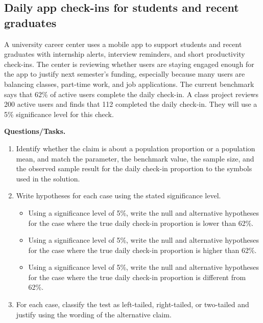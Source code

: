 	
	\begin{ExamProblems}
		
		\item
		\section{Daily app check-ins for students and recent graduates}
		A university career center uses a mobile app to support students and recent graduates with internship alerts, interview reminders, and short productivity check-ins. The center is reviewing whether users are staying engaged enough for the app to justify next semester's funding, especially because many users are balancing classes, part-time work, and job applications. The current benchmark says that 62\% of active users complete the daily check-in. A class project reviews 200 active users and finds that 112 completed the daily check-in. They will use a 5\% significance level for this check.
		
		\textbf{Questions/Tasks.}
		\begin{enumerate}
			\item[(C1)] Identify whether the claim is about a population proportion or a population mean, and match the parameter, the benchmark value, the sample size, and the observed sample result for the daily check-in proportion to the symbols used in the solution.
			\item[(C2)] Write hypotheses for each case using the stated significance level.
			\begin{itemize}
				\item[(a)] Using a significance level of 5\%, write the null and alternative hypotheses for the case where the true daily check-in proportion is lower than 62\%.
				\item[(b)] Using a significance level of 5\%, write the null and alternative hypotheses for the case where the true daily check-in proportion is higher than 62\%.
				\item[(c)] Using a significance level of 5\%, write the null and alternative hypotheses for the case where the true daily check-in proportion is different from 62\%.
			\end{itemize}
			\item[(C3)] For each case, classify the test as left-tailed, right-tailed, or two-tailed and justify using the wording of the alternative claim.
		\end{enumerate}
		

\end{ExamProblems}
